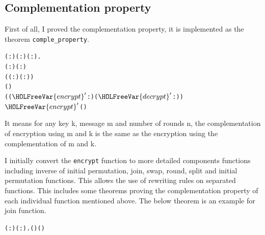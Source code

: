 \documentclass{article}
\begin{document}
\subsection{Complementation property}
First of all, I proved the complementation property, it is implemented as the theorem \verb|comple_property|.

\begin{alltt}
\HOLTokenTurnstile{} \HOLSymConst{\HOLTokenForall{}}( :) ( :) ( :).
     ( :) \HOLSymConst{\HOLTokenLt{}}  \HOLSymConst{\HOLTokenConj{}}  \HOLSymConst{\HOLTokenLt{}} ( :) \HOLSymConst{\HOLTokenConj{}}
        \HOLSymConst{=}
     (( : \HOLTokenMap{} )\HOLSymConst{,}( : \HOLTokenMap{} )) \HOLSymConst{\HOLTokenConj{}}
       (\HOLSymConst{\HOLTokenNeg{}}) \HOLSymConst{=}
     ((\ensuremath{\HOLFreeVar{encrypt}\sp{\prime{}}} : \HOLTokenMap{} )\HOLSymConst{,}(\ensuremath{\HOLFreeVar{decrypt}\sp{\prime{}}} : \HOLTokenMap{} )) \HOLSymConst{\HOLTokenImp{}}
     \HOLSymConst{\HOLTokenNeg{}}  \HOLSymConst{=} \ensuremath{\HOLFreeVar{encrypt}\sp{\prime{}}} (\HOLSymConst{\HOLTokenNeg{}})
\end{alltt}

It means for any key k, message m and number of rounds n, the complementation of encryption using m and k is the
same as the encryption using the complementation of m and k.

I initially convert the \verb|encrypt| function to more detailed components functions including inverse of initial permutation,
join, swap, round, split and initial permutation functions. This allows the use of rewriting rules on separated
functions. This includes some theorems proving the complementation property of each individual function mentioned above.
The below theorem is an example for join function.

\begin{alltt}
\HOLTokenTurnstile{} \HOLSymConst{\HOLTokenForall{}}( :) ( :).  (\HOLSymConst{\HOLTokenNeg{}}\HOLSymConst{,}\HOLSymConst{\HOLTokenNeg{}}) \HOLSymConst{=} \HOLSymConst{\HOLTokenNeg{}} (\HOLSymConst{,})
\end{alltt}
\end{document}
